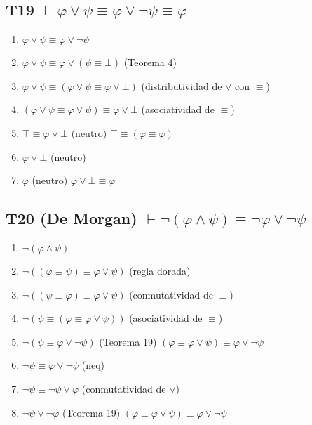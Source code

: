 \documentclass[a4paper,11pt]{article}
\begin{document}
\subsection{T19 $\vdash \varphi \lor \psi \equiv \varphi \lor \neg\psi \equiv \varphi $}

\begin{enumerate}
    \item $\varphi \lor \psi \equiv \varphi \lor \neg\psi$
    \item $\varphi \lor \psi \equiv \varphi \lor (\psi \equiv \bot)$ \hfill (Teorema 4)
    \item $\varphi \lor \psi \equiv (\varphi \lor \psi \equiv \varphi \lor \bot)$ \hfill (distributividad de $\lor$ con $\equiv$)
    \item $(\varphi \lor \psi \equiv \varphi \lor \psi) \equiv \varphi \lor \bot$ \hfill (asociatividad de $\equiv$)
    \item $\top \equiv \varphi \lor \bot$ \hfill (neutro) $\top \equiv (\varphi \equiv \varphi)$
    \item $\varphi \lor \bot$ \hfill (neutro)
    \item $\varphi$ \hfill (neutro) $\varphi \lor \bot \equiv \varphi$
\end{enumerate}

\subsection{T20 (De Morgan) $\vdash \neg(\varphi \land \psi) \equiv \neg\varphi \lor \neg\psi$}

\begin{enumerate}
    \item $\neg(\varphi \land \psi)$
    \item $\neg((\varphi \equiv \psi) \equiv \varphi \lor \psi)$ \hfill (regla dorada)
    \item $\neg((\psi \equiv \varphi) \equiv \varphi \lor \psi)$ \hfill (conmutatividad de $\equiv$)
    \item $\neg(\psi \equiv (\varphi \equiv \varphi \lor \psi))$ \hfill (asociatividad de $\equiv$)
    \item $\neg(\psi \equiv \varphi \lor \neg\psi)$ \hfill (Teorema 19) $(\varphi \equiv \varphi \lor \psi) \equiv \varphi \lor \neg\psi$

    \item $\neg\psi \equiv \varphi \lor \neg\psi$ \hfill (neq)
    \item $\neg\psi \equiv \neg\psi \lor \varphi$ \hfill (conmutatividad de $\lor$)
    \item $\neg\psi \lor \neg\varphi$ \hfill (Teorema 19) $(\varphi \equiv \varphi \lor \psi) \equiv \varphi \lor \neg\psi$


\end{enumerate}
\end{document}
